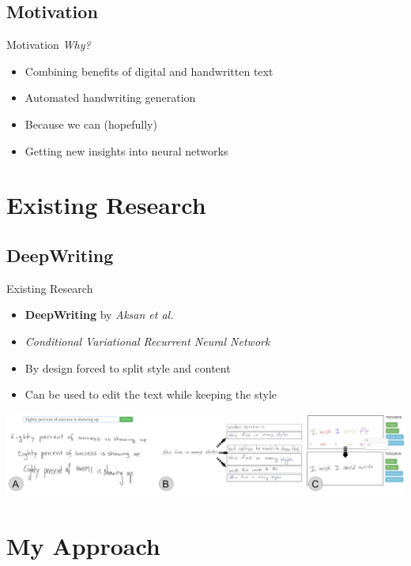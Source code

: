 \documentclass[aspectratio=169]{beamer}
\begin{document}
\subsection{Motivation}
\begin{frame}{Motivation}
\emph{Why?}
\begin{itemize}
\item Combining benefits of digital and handwritten text
\item Automated handwriting generation
\item Because we can (hopefully)
\item Getting new insights into neural networks
\end{itemize}
\end{frame}

\section{Existing Research}
\subsection{DeepWriting}
\begin{frame}{Existing Research}
\begin{itemize}
\item \textbf{DeepWriting} by \emph{Aksan et al.}
\item \emph{Conditional Variational Recurrent Neural Network}
\item By design forced to split style and content
\item Can be used to edit the text while keeping the style
\end{itemize}
\begin{center}
\includegraphics[scale=0.2]{pics/deepWritingExamples.jpg}
\end{center}
\end{frame}

\section{My Approach}
\end{document}
